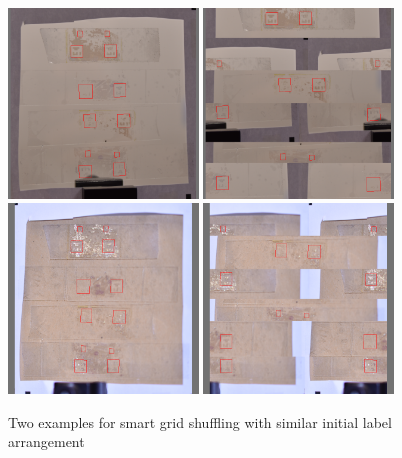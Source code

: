 \documentclass[10pt]{book}
\begin{document}
\begin{figure}
  \centering
     {\includegraphics[width=0.45\textwidth]{image/aug_sgs_before}}
     {\includegraphics[width=0.45\textwidth]{image/aug_sgs_after}}
     {\includegraphics[width=0.45\textwidth]{image/aug_sgs_before2}}
     {\includegraphics[width=0.45\textwidth]{image/aug_sgs_after2}}
  \caption{Two examples for smart grid shuffling with similar initial label arrangement}
  \label{fig:aug_sgs_example}
\end{figure}
\end{document}
